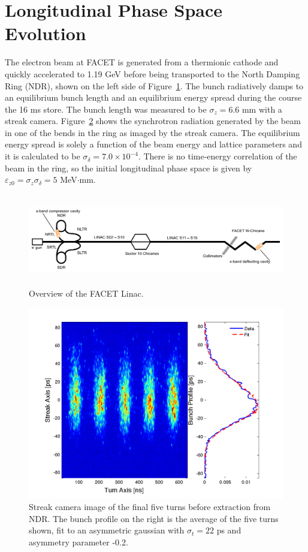 \section{Longitudinal Phase Space Evolution}
The electron beam at FACET is generated from a thermionic cathode and quickly accelerated to 1.19 GeV before being transported to the North Damping Ring (NDR), shown on the left side of Figure~\ref{schem}. The bunch radiatively damps to an equilibrium bunch length and an equilibrium energy spread during the course the 16 ms store. The bunch length was measured to be $\sigma_z = 6.6$ mm with a streak camera. Figure~\ref{streak} shows the synchrotron radiation generated by the beam in one of the bends in the ring as imaged by the streak camera. The equilibrium energy spread is solely a function of the beam energy and lattice parameters and it is calculated to be $\sigma_{\delta} = 7.0 \times 10^{-4}$. There is no time-energy correlation of the beam in the ring, so the initial longitudinal phase space is given by $\varepsilon_{z0} = \sigma_z \sigma_{\delta} = 5$ MeV$\cdot$mm. 

\begin{figure}[t]
\includegraphics[width=\textwidth,height=4cm]{figures/facet_schem.pdf}
  \caption{Overview of the FACET Linac.}
  \label{schem}
\end{figure}

\begin{figure}[hb]
  \includegraphics[width=\columnwidth]{figures/combo.pdf}
  \caption{Streak camera image of the final five turns before extraction from NDR. The bunch profile on the right is the average of the five turns shown, fit to an asymmetric gaussian with $\sigma_t = 22$ ps and asymmetry parameter -0.2.}
  \label{streak}
\end{figure}

